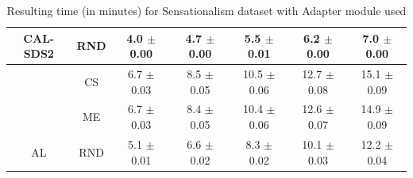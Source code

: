 \begin{table}[htbp]
\begin{tabular*}{\linewidth}{c|c|@{\extracolsep{\fill}}ccccc}
\multirow{-3}{*}{\raggedright\arraybackslash CAL-SDS2} & RND & 4.0 $\pm$ {\small 0.00} & 4.7 $\pm$ {\small 0.00} & 5.5 $\pm$ {\small 0.01} & 6.2 $\pm$ {\small 0.00} & 7.0 $\pm$ {\small 0.00}\\
\midrule
 & CS & 6.7 $\pm$ {\small 0.03} & 8.5 $\pm$ {\small 0.05} & 10.5 $\pm$ {\small 0.06} & 12.7 $\pm$ {\small 0.08} & 15.1 $\pm$ {\small 0.09}\\

 & ME & 6.7 $\pm$ {\small 0.03} & 8.4 $\pm$ {\small 0.05} & 10.4 $\pm$ {\small 0.06} & 12.6 $\pm$ {\small 0.07} & 14.9 $\pm$ {\small 0.09}\\

\multirow{-3}{*}{\raggedright\arraybackslash AL} & RND & 5.1 $\pm$ {\small 0.01} & 6.6 $\pm$ {\small 0.02} & 8.3 $\pm$ {\small 0.02} & 10.1 $\pm$ {\small 0.03} & 12.2 $\pm$ {\small 0.04}\\
\bottomrule
\end{tabular*}
\caption{Resulting time (in minutes) for Sensationalism dataset with Adapter module used}
\label{tab:time_full_sensation_10_adapter}
\end{table}
